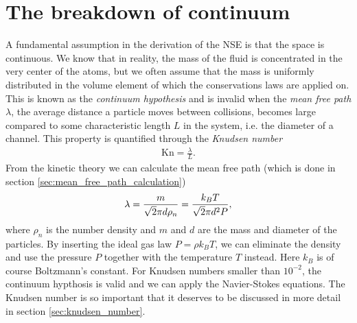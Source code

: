 \section{The breakdown of continuum}
\label{sec:continuum_breakdown}
A fundamental assumption in the derivation of the NSE is that the space is continuous. We know that in reality, the mass of the fluid is concentrated in the very center of the atoms, but we often assume that the mass is uniformly distributed in the volume element of which the conservations laws are applied on. This is known as the \textit{continuum hypothesis} and is invalid when the \textit{mean free path} $\lambda$, the average distance a particle moves between collisions, becomes large compared to some characteristic length $L$ in the system, i.e. the diameter of a channel\cite{karniadakis2005microflows}. This property is quantified through the \textit{Knudsen number}
\begin{align}
	\text{Kn} = \frac{\lambda}{L}.
\end{align}
From the kinetic theory we can calculate the mean free path (which is done in section \ref{sec:mean_free_path_calculation})
\begin{align}
	\lambda = {m\over \sqrt 2 \pi d \rho_n} = {k_B T\over \sqrt 2 \pi d^2 P},
\end{align}
where $\rho_n$ is the number density and $m$ and $d$ are the mass and diameter of the particles. By inserting the ideal gas law $P = \rho k_BT$, we can eliminate the density and use the pressure $P$ together with the temperature $T$ instead. Here $k_B$ is of course Boltzmann's constant. For Knudsen numbers smaller than $10^{-2}$, the continuum hypthosis is valid and we can apply the Navier-Stokes equations\cite{karniadakis2005microflows}. The Knudsen number is so important that it deserves to be discussed in more detail in section \ref{sec:knudsen_number}.
